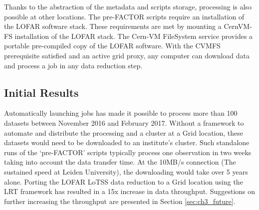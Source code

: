 Thanks to the abstraction of the metadata and scripts storage, processing is also possible at other locations. The pre-FACTOR scripts require an installation of the LOFAR software stack\cite{lofar_stack}. These requirements are met by mounting a CernVM-FS\cite{cvmfs2008}\cite{softdrive} installation of the LOFAR stack. The Cern-VM FileSystem service provides a portable pre-compiled copy of the LOFAR software.  With the CVMFS prerequisite satisfied and an active grid proxy, any computer can download data and process a job in any data reduction step. 


\subsection{Initial Results}\label{sec:ch3_performance_results}

Automatically launching jobs has made it possible to process more than 100 datasets between November 2016 and February 2017. Without a framework to automate and distribute the processing and a cluster at a Grid location, these datasets would need to be downloaded to an institute's cluster. Such standalone runs of the `pre-FACTOR' scripts typically process one observation in two weeks taking into account the data transfer time.  At the 10MB/s connection (The sustained speed at Leiden University), the downloading would take over 5 years alone. Porting the LOFAR LoTSS data reduction to a Grid location using the LRT framework has resulted in a 15x increase in data throughput. Suggestions on further increasing the throughput are presented in Section \ref{sec:ch3_future}.
 
% 


